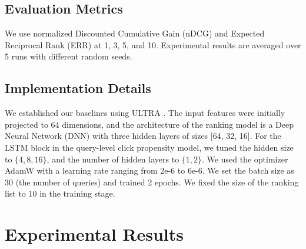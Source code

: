 \subsection{Evaluation Metrics}
We use normalized Discounted Cumulative Gain (nDCG) and Expected Reciprocal Rank (ERR) at 1, 3, 5, and 10. Experimental results are averaged over 5 runs with different random seeds.


\subsection{Implementation Details} We established our baselines using ULTRA \cite{tran2021ultra}. The input features were initially projected to 64 dimensions, and the architecture of the ranking model is a Deep Neural Network (DNN) with three hidden layers of sizes [64, 32, 16]. For the LSTM block in the query-level click propensity model, we tuned the hidden size to $\{4,8,16\}$, and the number of hidden layers to $\{1,2\}$. We used the optimizer AdamW with a learning rate ranging from 2e-6 to 6e-6. We set the batch size as 30 (the number of queries) and trained 2 epochs. We fixed the size of the ranking list to 10 in the training stage.
\section{Experimental Results}
